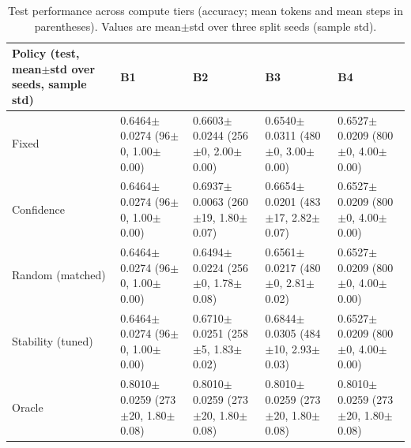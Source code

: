 \begin{table}[t]
\centering
\small
\setlength{\tabcolsep}{3pt}
\renewcommand{\arraystretch}{1.1}
\begin{tabularx}{\textwidth}{lYYYY}
\toprule
Policy (test, mean$\pm$std over seeds, sample std) & B1 & B2 & B3 & B4 \\
\midrule
Fixed & 0.6464$\pm$0.0274 (96$\pm$0, 1.00$\pm$0.00) & 0.6603$\pm$0.0244 (256$\pm$0, 2.00$\pm$0.00) & 0.6540$\pm$0.0311 (480$\pm$0, 3.00$\pm$0.00) & 0.6527$\pm$0.0209 (800$\pm$0, 4.00$\pm$0.00) \\
\addlinespace
Confidence & 0.6464$\pm$0.0274 (96$\pm$0, 1.00$\pm$0.00) & 0.6937$\pm$0.0063 (260$\pm$19, 1.80$\pm$0.07) & 0.6654$\pm$0.0201 (483$\pm$17, 2.82$\pm$0.07) & 0.6527$\pm$0.0209 (800$\pm$0, 4.00$\pm$0.00) \\
Random (matched) & 0.6464$\pm$0.0274 (96$\pm$0, 1.00$\pm$0.00) & 0.6494$\pm$0.0224 (256$\pm$0, 1.78$\pm$0.08) & 0.6561$\pm$0.0217 (480$\pm$0, 2.81$\pm$0.02) & 0.6527$\pm$0.0209 (800$\pm$0, 4.00$\pm$0.00) \\
Stability (tuned) & 0.6464$\pm$0.0274 (96$\pm$0, 1.00$\pm$0.00) & 0.6710$\pm$0.0251 (258$\pm$5, 1.83$\pm$0.02) & 0.6844$\pm$0.0305 (484$\pm$10, 2.93$\pm$0.03) & 0.6527$\pm$0.0209 (800$\pm$0, 4.00$\pm$0.00) \\
Oracle & 0.8010$\pm$0.0259 (273$\pm$20, 1.80$\pm$0.08) & 0.8010$\pm$0.0259 (273$\pm$20, 1.80$\pm$0.08) & 0.8010$\pm$0.0259 (273$\pm$20, 1.80$\pm$0.08) & 0.8010$\pm$0.0259 (273$\pm$20, 1.80$\pm$0.08) \\
\bottomrule
\end{tabularx}
\caption{Test performance across compute tiers (accuracy; mean tokens and mean steps in parentheses). Values are mean$\pm$std over three split seeds (sample std).}
\label{tab:main_results_allbudgets}
\end{table}
